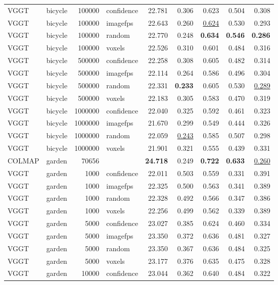 \begin{table}[H]
\begin{tabular}{llrlrrrrr}
VGGT & bicycle & 100000 & confidence & 22.781 & 0.306 & 0.623 & 0.504 & 0.308 \\
VGGT & bicycle & 100000 & imagefps & 22.643 & 0.260 & \underline{0.624} & 0.530 & 0.293 \\
VGGT & bicycle & 100000 & random & 22.770 & 0.248 & \textbf{0.634} & \textbf{0.546} & \textbf{0.286} \\
VGGT & bicycle & 100000 & voxels & 22.526 & 0.310 & 0.601 & 0.484 & 0.316 \\
VGGT & bicycle & 500000 & confidence & 22.258 & 0.308 & 0.605 & 0.482 & 0.314 \\
VGGT & bicycle & 500000 & imagefps & 22.114 & 0.264 & 0.586 & 0.496 & 0.304 \\
VGGT & bicycle & 500000 & random & 22.331 & \textbf{0.233} & 0.605 & 0.530 & \underline{0.289} \\
VGGT & bicycle & 500000 & voxels & 22.183 & 0.305 & 0.583 & 0.470 & 0.319 \\
VGGT & bicycle & 1000000 & confidence & 22.040 & 0.325 & 0.592 & 0.461 & 0.323 \\
VGGT & bicycle & 1000000 & imagefps & 21.670 & 0.299 & 0.549 & 0.444 & 0.326 \\
VGGT & bicycle & 1000000 & random & 22.059 & \underline{0.243} & 0.585 & 0.507 & 0.298 \\
VGGT & bicycle & 1000000 & voxels & 21.901 & 0.321 & 0.555 & 0.439 & 0.331 \\
\midrule
COLMAP & garden & 70656 &  & \textbf{24.718} & 0.249 & \textbf{0.722} & \textbf{0.633} & \underline{0.260} \\
VGGT & garden & 1000 & confidence & 22.011 & 0.503 & 0.559 & 0.331 & 0.391 \\
VGGT & garden & 1000 & imagefps & 22.325 & 0.500 & 0.563 & 0.341 & 0.389 \\
VGGT & garden & 1000 & random & 22.328 & 0.492 & 0.566 & 0.347 & 0.386 \\
VGGT & garden & 1000 & voxels & 22.256 & 0.499 & 0.562 & 0.339 & 0.389 \\
VGGT & garden & 5000 & confidence & 23.027 & 0.385 & 0.624 & 0.460 & 0.334 \\
VGGT & garden & 5000 & imagefps & 23.350 & 0.372 & 0.636 & 0.481 & 0.327 \\
VGGT & garden & 5000 & random & 23.350 & 0.367 & 0.636 & 0.484 & 0.325 \\
VGGT & garden & 5000 & voxels & 23.177 & 0.376 & 0.635 & 0.475 & 0.328 \\
VGGT & garden & 10000 & confidence & 23.044 & 0.362 & 0.640 & 0.484 & 0.322 \\

\end{tabular}
\end{table}
